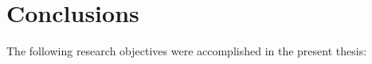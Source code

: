 \chapter{Conclusions}
The following research objectives were accomplished in the present thesis:
\Blinditemize[3]

